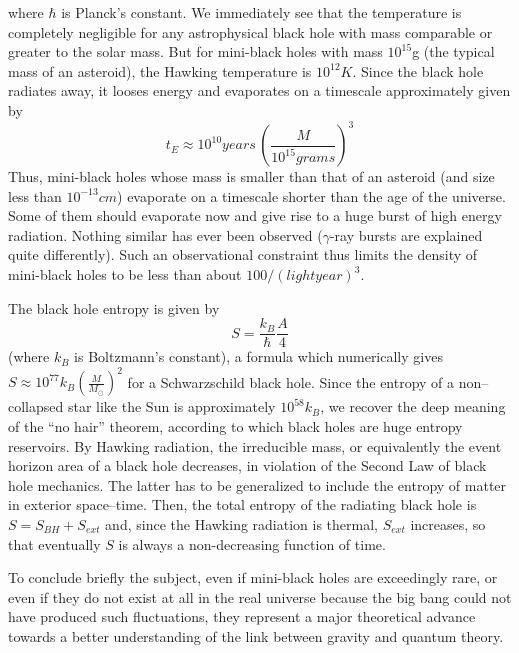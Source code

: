\documentclass{lamuphys}
\begin{document}
where  $\hbar$
is Planck's constant. We immediately see that the temperature is completely
negligible for any astrophysical black hole with mass comparable or greater 
to the solar mass. But for mini-black holes with mass $10^{15}$g (the typical
mass of an asteroid), the Hawking temperature is $10^{12} K$. 
Since the black hole  radiates away, it looses energy and evaporates on a
timescale approximately given by 
\begin{equation}
  t_E \approx 10^{10} years \, \left(\frac{M}{10^{15} grams}\right)^3      
        \label{luminet:12}
 \end{equation}
Thus, mini-black holes whose mass is smaller than that of an asteroid (and
 size less than $10^{-13} cm$) evaporate on a timescale shorter than the
age of the universe. Some of them should evaporate now and give rise to a huge
burst of high energy radiation. Nothing similar has ever been observed 
($\gamma$-ray bursts are explained quite differently). Such an observational
constraint thus limits the density of mini-black holes to be less than about
$100 /(lightyear)^3$. 

The black hole entropy is given by
\begin{equation}
        S = \frac{k_B}{\hbar} \frac{A}{4}
        \label{luminet:13}
\end{equation}
 (where $k_B$ is Boltzmann's constant), a formula which numerically
gives $S \approx 10^{77} k_B(\frac{M}{M_{\odot}})^2$ for a Schwarzschild black hole.
Since the entropy of a non--collapsed star like the Sun is approximately
$10^{58} k_B$,
we recover the deep meaning of the ``no hair'' theorem, according to
which black holes are huge entropy reservoirs.
By Hawking radiation, the irreducible mass, or equivalently the event 
horizon area of a black hole decreases, in violation of the Second Law of black hole mechanics. The
latter has to be generalized to include the entropy of matter in exterior
space--time. Then, the total entropy of the radiating black hole is
$S = S_{BH} + S_{ext}$ and, since the Hawking radiation is thermal, $S_{ext}$
increases, so that eventually $S$ is always a non-decreasing function of time.  

To conclude briefly the subject, even if mini-black holes are exceedingly rare, or even if they do not
exist at all in the real universe because the big bang could not have produced 
such fluctuations, they
represent a major theoretical advance towards a better understanding 
of the link between gravity
and quantum theory. 
\end{document}
